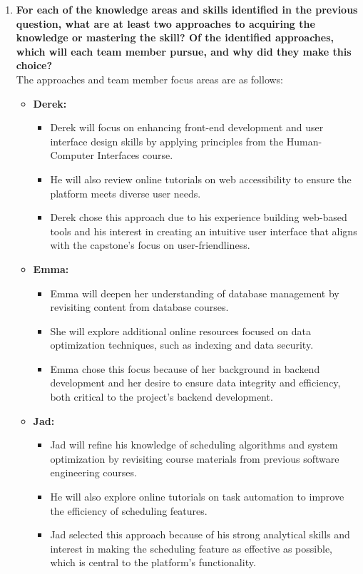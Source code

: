 \begin{enumerate}
    \item \textbf{For each of the knowledge areas and skills identified in the previous question, what are at least two approaches to acquiring the knowledge or mastering the skill? Of the identified approaches, which will each team member pursue, and why did they make this choice?} \\
    The approaches and team member focus areas are as follows:
    \begin{itemize}
        \item \textbf{Derek:}
        \begin{itemize}
            \item Derek will focus on enhancing front-end development and user interface design skills by applying principles from the Human-Computer Interfaces course.
            \item He will also review online tutorials on web accessibility to ensure the platform meets diverse user needs.
            \item Derek chose this approach due to his experience building web-based tools and his interest in creating an intuitive user interface that aligns with the capstone’s focus on user-friendliness.
        \end{itemize}

        \item \textbf{Emma:}
        \begin{itemize}
            \item Emma will deepen her understanding of database management by revisiting content from database courses.
            \item She will explore additional online resources focused on data optimization techniques, such as indexing and data security.
            \item Emma chose this focus because of her background in backend development and her desire to ensure data integrity and efficiency, both critical to the project’s backend development.
        \end{itemize}

        \item \textbf{Jad:}
        \begin{itemize}
            \item Jad will refine his knowledge of scheduling algorithms and system optimization by revisiting course materials from previous software engineering courses.
            \item He will also explore online tutorials on task automation to improve the efficiency of scheduling features.
            \item Jad selected this approach because of his strong analytical skills and interest in making the scheduling feature as effective as possible, which is central to the platform's functionality.
        \end{itemize}


\end{itemize}
\end{enumerate}
